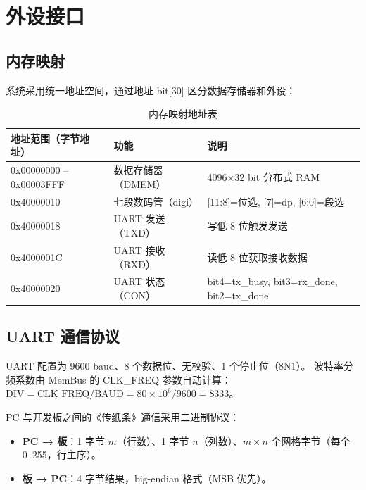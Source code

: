 \documentclass[12pt,a4paper]{ctexart}
\begin{document}
\section{外设接口}

\subsection{内存映射}

系统采用统一地址空间，通过地址 bit[30] 区分数据存储器和外设：

\begin{table}[H]
\centering
\caption{内存映射地址表}
\begin{tabular}{@{}lll@{}}
\toprule
\textbf{地址范围（字节地址）} & \textbf{功能} & \textbf{说明} \\
\midrule
0x00000000 -- 0x00003FFF & 数据存储器（DMEM） & 4096×32 bit 分布式 RAM \\
0x40000010              & 七段数码管（digi） & [11:8]=位选, [7]=dp, [6:0]=段选 \\
0x40000018              & UART 发送（TXD）  & 写低 8 位触发发送 \\
0x4000001C              & UART 接收（RXD）  & 读低 8 位获取接收数据 \\
0x40000020              & UART 状态（CON）  & bit4=tx\_busy, bit3=rx\_done, bit2=tx\_done \\
\bottomrule
\end{tabular}
\label{tab:mmio}
\end{table}

\subsection{UART 通信协议}

UART 配置为 9600 baud、8 个数据位、无校验、1 个停止位（8N1）。
波特率分频系数由 MemBus 的 CLK\_FREQ 参数自动计算：
$\text{DIV} = \text{CLK\_FREQ} / \text{BAUD} = 80\times10^6 / 9600 = 8333$。

PC 与开发板之间的《传纸条》通信采用二进制协议：
\begin{itemize}[nosep]
  \item \textbf{PC → 板}：1 字节 $m$（行数）、1 字节 $n$（列数）、$m \times n$
  个网格字节（每个 0--255，行主序）。
  \item \textbf{板 → PC}：4 字节结果，big-endian 格式（MSB 优先）。
\end{itemize}

\end{document}
